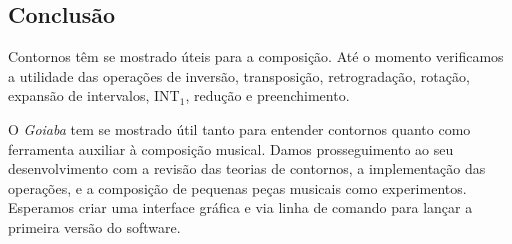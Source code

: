 \documentclass{sciposter}
\newcommand{\goiaba}[1]{\textit{Goiaba}}
\begin{document}
\begin{multicols}{3}

\section{Conclusão}

Contornos têm se mostrado úteis para a composição. Até o momento
verificamos a utilidade das operações de inversão, transposição,
retrogradação, rotação, expansão de intervalos, INT$_1$, redução e
preenchimento.

O \goiaba{} tem se mostrado útil tanto para entender contornos quanto
como ferramenta auxiliar à composição musical. Damos prosseguimento ao
seu desenvolvimento com a revisão das teorias de contornos, a
implementação das operações, e a composição de pequenas peças musicais
como experimentos. Esperamos criar uma interface gráfica e via linha
de comando para lançar a primeira versão do software.

\renewcommand{\refname}{Bibliografia}



\end{multicols}
\end{document}
